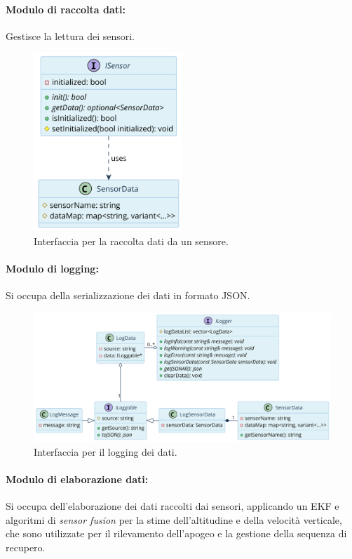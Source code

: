 \documentclass[12pt,a4paper,twoside]{book}
\begin{document}
\paragraph{\textbf{Modulo di raccolta dati:}} Gestisce la lettura dei sensori.
\begin{figure}[H]
    \centering
    \includegraphics[width=0.5\textwidth]{img/uml/sensor.png}
    \caption{Interfaccia per la raccolta dati da un sensore.}
    \label{fig:flight-computer-data-collection}
\end{figure}

\newpage
\paragraph{\textbf{Modulo di logging:}}Si occupa della serializzazione dei dati in formato JSON.
\begin{figure}[H]
    \centering
    \includegraphics[width=1\textwidth]{img/uml/logger.png}
    \caption{Interfaccia per il logging dei dati.}
    \label{fig:flight-computer-logger}
\end{figure}

\newpage
\paragraph{\textbf{Modulo di elaborazione dati:}}Si occupa dell'elaborazione dei
dati raccolti dai sensori, applicando un \ac{EKF} e algoritmi di \emph{sensor
    fusion} per la stime dell'altitudine e della velocità verticale, che sono
utilizzate per il rilevamento dell'apogeo e la gestione della sequenza di recupero.
\end{document}
